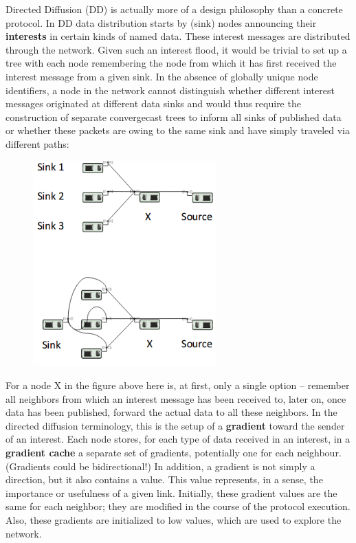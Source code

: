 \documentclass[12pt]{article}
\begin{document}
Directed Diffusion (DD) is actually more of a design philosophy than
a concrete protocol. In DD data distribution starts by (sink) nodes announcing
their \textbf{interests} in certain kinds of named data. These interest
messages are distributed through the network. Given such an interest flood, it
would be trivial to set up a tree with each node remembering the node from
which it has first received the interest message from a given sink. In the
absence of globally unique node identifiers, a node in the network cannot
distinguish whether different interest messages originated at different data
sinks and would thus require the construction of separate convergecast trees to
inform all sinks of published data or whether these packets are owing to the
same sink and have simply traveled via different paths:
\begin{figure}[H]
    \centering
    \includegraphics[width=200pt]{two_phase_pull.png}
\end{figure}
For a node X in the figure above here is, at first, only a single option --
remember all neighbors from which an interest message has been received to,
later on, once data has been published, forward the actual data to all these
neighbors. In the directed diffusion terminology, this is the setup of
a \textbf{gradient} toward the sender of an interest. Each node stores, for
each type of data received in an interest, in a \textbf{gradient cache}
a separate set of gradients, potentially one for each neighbour. (Gradients
could be bidirectional!) In addition, a gradient is not simply a direction, but
it also contains a value. This value represents, in a sense, the importance or
usefulness of a given link. Initially, these gradient values are the same for
each neighbor; they are modified in the course of the protocol execution. Also,
these gradients are initialized to low values, which are used to explore the
network.
\end{document}

